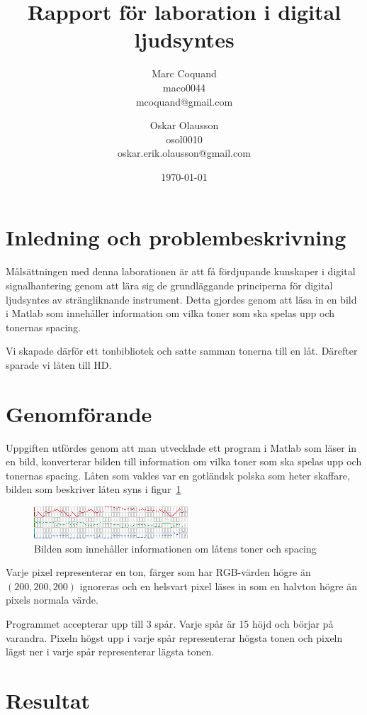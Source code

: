 \documentclass[12pt]{article}
\title{Rapport för laboration i digital ljudsyntes}
\author{
    Marc Coquand \\
    maco0044 \\
    mcoquand@gmail.com\\
    \and
    Oskar Olausson \\
    osol0010 \\
    oskar.erik.olausson@gmail.com\\
}
\date{\today}
\begin{document}
\lstset{language=Matlab}
\maketitle
\tableofcontents

\newpage

\section{Inledning och problembeskrivning}

Målsättningen med denna laborationen är att få fördjupande kunskaper i digital
signalhantering genom att lära sig de grundläggande principerna för digital
ljudsyntes av strängliknande instrument. Detta gjordes genom att läsa in en bild
i Matlab som innehåller information om vilka toner som ska spelas upp och
tonernas spacing. 

Vi skapade därför ett tonbibliotek och satte samman tonerna till en låt.
Därefter sparade vi låten till HD.


\section{Genomförande}

Uppgiften utfördes genom att man utvecklade ett program i Matlab som läser in en
bild, konverterar bilden till information om vilka toner som ska spelas upp och
tonernas spacing. Låten som valdes var en gotländsk polska som heter skaffare,
bilden som beskriver låten syns i figur~\ref{fig:skaffare}

\begin{figure}[!htb]
    \centering
    \includegraphics[scale=1.5]{../SKAFFARE.png}
    \caption{Bilden som innehåller informationen om låtens toner och spacing}
    \label{fig:skaffare}
\end{figure}

Varje pixel representerar en ton, färger som har RGB-värden högre än
$(200,200,200)$ ignoreras och en helsvart pixel läses in som en halvton högre än
pixels normala värde. 

Programmet accepterar upp till 3 spår. Varje spår är 15 höjd och börjar på
varandra. Pixeln högst upp i varje spår representerar högsta tonen och pixeln
lägst ner i varje spår representerar lägsta tonen.


\section{Resultat}
\end{document}
